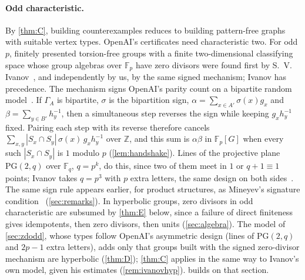 \documentclass[11pt]{article}
\theoremstyle{definition}
\theoremstyle{plain}
\newcommand{\F}{\mathbb{F}}
\newcommand{\Z}{\mathbb{Z}}
\newcommand{\PG}{\mathrm{PG}}
\begin{document}
\paragraph{Odd characteristic.} By \cref{thm:C}, building counterexamples reduces to building pattern-free graphs with suitable vertex types. OpenAI's certificates need characteristic two. For odd $p$, finitely presented torsion-free groups with a finite two-dimensional classifying space whose group algebras over $\F_p$ have zero divisors were found first by S.~V. Ivanov~\cite[Thm.~1.1]{Ivanov2026}, and independently by us, by the same signed mechanism; Ivanov has precedence. The mechanism signs OpenAI's parity count on a bipartite random model~\cite[Lemma~2.2, Construction~4.1]{Ivanov2026}. If $\Gamma_A$ is bipartite, $\sigma$ is the bipartition sign, $\alpha=\sum_{x\in A'}\sigma(x)g_x$ and $\beta=\sum_{y\in B'}h_y^{-1}$, then a simultaneous step reverses the sign while keeping $g_xh_y^{-1}$ fixed. Pairing each step with its reverse therefore cancels $\sum_{x,y}|S_x\cap S_y|\,\sigma(x)\,g_xh_y^{-1}$ over $\Z$, and this sum is $\alpha\beta$ in $\F_p[G]$ when every such $|S_x\cap S_y|$ is $1$ modulo $p$ (\cref{lem:handshake}). Lines of the projective plane $\PG(2,q)$ over $\F_q$, $q=p^k$, do this, since two of them meet in $1$ or $q+1\equiv1$ points; Ivanov takes $q=p^3$ with $p$ extra letters, the same design on both sides~\cite[Constructions~3.1 and~3.2]{Ivanov2026}. The same sign rule appears earlier, for product structures, as Mineyev's signature condition~\cite[\S2.2]{Mineyev2024} (\cref{sec:remarks}). In hyperbolic groups, zero divisors in odd characteristic are subsumed by \cref{thm:E} below, since a failure of direct finiteness gives idempotents, then zero divisors, then units (\cref{sec:algebra}). The model of \cref{sec:zdodd}, whose types follow OpenAI's asymmetric design (lines of $\PG(2,q)$ and $2p-1$ extra letters), adds only that groups built with the signed zero-divisor mechanism are hyperbolic (\cref{thm:D}); \cref{thm:C} applies in the same way to Ivanov's own model, given his estimates (\cref{rem:ivanovhyp}).  builds on that section.
\end{document}
